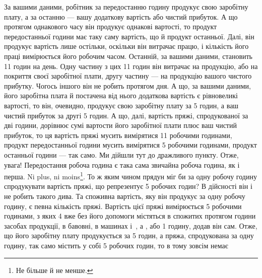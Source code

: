 За вашими даними, робітник за передостанню годину продукує свою заробітну плату, а за останню — вашу
додаткову вартість або чистий прибуток. А що протягом однакового часу він продукує
однакові вартості, то продукт передостанньої години має таку
саму вартість, що й продукт останньої. Далі, він продукує вартість лише остільки, оскільки він
витрачає працю, і кількість
його праці вимірюється його робочим часом. Останній, за вашими даними, становить 11 годин на
день. Одну частину з цих 11 годин
він витрачає на продукцію, або на покриття своєї заробітної плати, другу частину — на продукцію
вашого чистого прибутку. Чогось іншого він не робить протягом дня. А що, за вашими даними, його
заробітна плата й постачена від нього додаткова вартість є рівновеликі вартості, то він, очевидно,
продукує свою заробітну плату за 5 годин, а ваш чистий прибуток за другі
5 годин. А що, далі, вартість пряжі, спродукованої за дві години, дорівнює сумі вартости його
заробітної плати плюс ваш
чистий прибуток, то ця вартість пряжі мусить вимірятися 11 робочими
годинами, продукт передостанньої години мусить вимірятися 5 робочими годинами, продукт останньої
години — так
само. Ми дійшли тут до дражливого пункту. Отже, увага! Передостання робоча година є така сама
звичайна робоча година, як і
перша. Ni plus, ni moins\footnote*{
Не більше й не менше. 
}. То ж яким чином прядун міг би за одну робочу годину спродукувати
вартість пряжі, що репрезентує 5 робочих годин? В дійсності він і не робить такого дива. Та
споживна вартість, яку він продукує за одну робочу годину, є певна кількість пряжі. Вартість цієї
пряжі вимірюється 5 робочими годинами, з яких 4 вже без його допомоги містяться в спожитих
протягом години засобах продукції, в бавовні, в машинах і~, а , або 1 годину, додав він
сам. Отже, що його заробітну плату продукується за 5 годин, а пряжа, спродукована за одну годину,
так само містить у собі 5 робочих годин, то в тому зовсім немає
\parbreak{}  %
